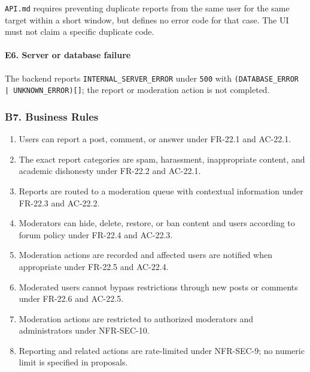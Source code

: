 \documentclass[12pt]{article}
\begin{document}
\texttt{API.md} requires preventing duplicate reports from the same user for the same target within a short window, but defines no error code for that case. The UI must not claim a specific duplicate code.
\par\medskip

\hypertarget{sec:e6-server-or-database-failure}{}
\paragraph*{E6. Server or database failure}
\par\medskip

The backend reports \texttt{INTERNAL\_SERVER\_ERROR} under \texttt{500} with \texttt{(DATABASE\_ERROR | UNKNOWN\_ERROR)[]}; the report or moderation action is not completed.
\par\medskip

\hypertarget{sec:b7-business-rules}{}
\subsubsection*{B7. Business Rules}
\par\medskip

\begin{enumerate}
\item Users can report a post, comment, or answer under FR-22.1 and AC-22.1.
\item The exact report categories are spam, harassment, inappropriate content, and academic dishonesty under FR-22.2 and AC-22.1.
\item Reports are routed to a moderation queue with contextual information under FR-22.3 and AC-22.2.
\item Moderators can hide, delete, restore, or ban content and users according to forum policy under FR-22.4 and AC-22.3.
\item Moderation actions are recorded and affected users are notified when appropriate under FR-22.5 and AC-22.4.
\item Moderated users cannot bypass restrictions through new posts or comments under FR-22.6 and AC-22.5.
\item Moderation actions are restricted to authorized moderators and administrators under NFR-SEC-10.
\item Reporting and related actions are rate-limited under NFR-SEC-9; no numeric limit is specified in proposals.
\end{enumerate}
\par\medskip
\end{document}
